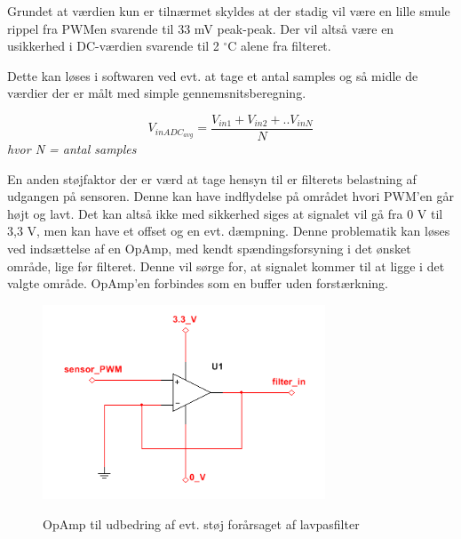 Grundet at værdien kun er tilnærmet skyldes at der stadig vil være en lille smule rippel fra PWMen svarende til 33 mV peak-peak. Der vil altså være en usikkerhed i DC-værdien svarende til 2 $^{\circ}$C alene fra filteret.

Dette kan løses i softwaren ved evt. at tage et antal samples og så midle de værdier der er målt med simple gennemsnitsberegning. 

\begin{equation}
V_{inADC_{avg}} = \frac{V_{in1} + V_{in2} + .. V_{inN}}{N}
\end{equation} 
\textit{hvor N = antal samples}

En anden støjfaktor der er værd at tage hensyn til er filterets belastning af udgangen på sensoren. Denne kan have indflydelse på området hvori PWM'en går højt og lavt. Det kan altså ikke med sikkerhed siges at signalet vil gå fra 0 V til 3,3 V, men kan have et offset og en evt. dæmpning. Denne problematik kan løses ved indsættelse af en OpAmp, med kendt spændingsforsyning i det ønsket område, lige før filteret. Denne vil sørge for, at signalet kommer til at ligge i det valgte område. OpAmp'en forbindes som en buffer uden forstærkning. 

\begin{figure}[htb]
\centering
{\includegraphics[width=0.75\textwidth]{filer/design/Billeder/sht_opamp.png}}
\caption{OpAmp til udbedring af evt. støj forårsaget af lavpasfilter}
\label{lab:sht_opamp}
\end{figure}
